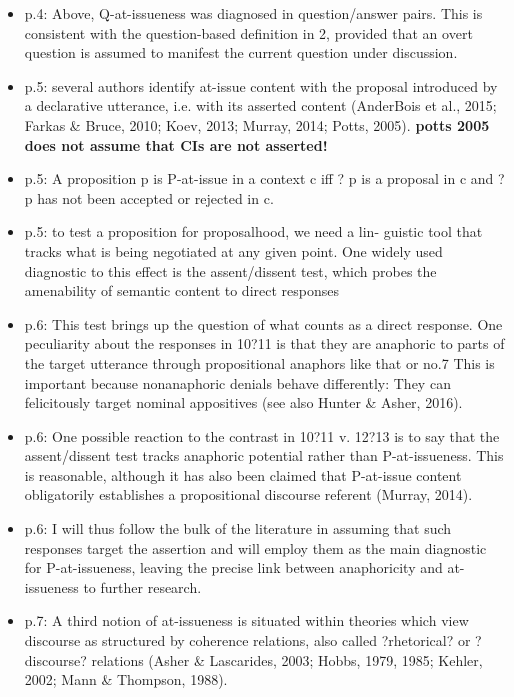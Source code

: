 \documentclass[11pt,fleqn]{article}
\newcommand{\6}{\mbox{$[\hspace*{-.6mm}[$}}
\newcommand{\9}{\mbox{$]\hspace*{-.6mm}]$}}
\begin{document}
\begin{itemize}
\begin{itemize}
\begin{itemize}
\item p.4: Above, Q-at-issueness was diagnosed in question/answer pairs. This is consistent with the question-based definition in 2, provided that an overt question is assumed to manifest the current question under discussion.

\item p.5: several authors identify at-issue content with the proposal introduced by a declarative utterance, i.e. with its asserted content (AnderBois et al., 2015; Farkas \& Bruce, 2010; Koev, 2013; Murray, 2014; Potts, 2005). {\bf potts 2005 does not assume that CIs are not asserted!}

\item p.5: A proposition p is P-at-issue in a context c iff ? p is a proposal in c and ? p has not been accepted or rejected in c.

\item p.5: to test a proposition for proposalhood, we need a lin- guistic tool that tracks what is being negotiated at any given point. One widely used diagnostic to this effect is the assent/dissent test, which probes the amenability of semantic content to direct responses

\item p.6: This test brings up the question of what counts as a direct response. One peculiarity about the responses in 10?11 is that they are anaphoric to parts of the target utterance through propositional anaphors like that or no.7 This is important because nonanaphoric denials behave differently: They can felicitously target nominal appositives (see also Hunter \& Asher, 2016).

\item p.6: One possible reaction to the contrast in 10?11 v. 12?13 is to say that the assent/dissent test tracks anaphoric potential rather than P-at-issueness. This is reasonable, although it has also been claimed that P-at-issue content obligatorily establishes a propositional discourse referent (Murray, 2014).

\item p.6: I will thus follow the bulk of the literature in assuming that such responses target the assertion and will employ them as the main diagnostic for P-at-issueness, leaving the precise link between anaphoricity and at-issueness to further research.

\item p.7: A third notion of at-issueness is situated within theories which view discourse as structured by coherence relations, also called ?rhetorical? or ?discourse? relations (Asher \& Lascarides, 2003; Hobbs, 1979, 1985; Kehler, 2002; Mann \& Thompson, 1988). 


\end{itemize}
\end{itemize}
\end{itemize}
\end{document}
